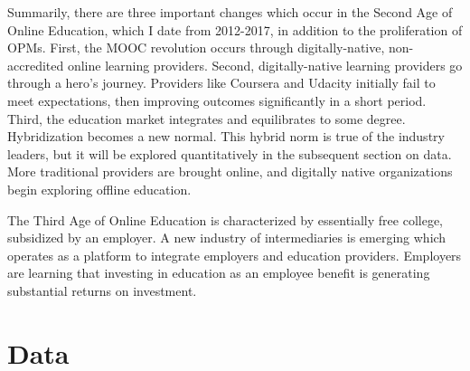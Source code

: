 \documentclass[review]{elsarticle}
\begin{document}
    Summarily, there are three important changes which occur in the Second Age of Online Education, which I date from 2012-2017, in addition to the proliferation of OPMs.
    First, the MOOC revolution occurs through digitally-native, non-accredited online learning providers.
    Second, digitally-native learning providers go through a hero's journey. Providers like Coursera and Udacity initially fail to meet expectations, then improving outcomes significantly in a short period.
    Third, the education market integrates and equilibrates to some degree. Hybridization becomes a new normal.
    This hybrid norm is true of the industry leaders, but it will be explored quantitatively in the subsequent section on data.
    More traditional providers are brought online, and digitally native organizations begin exploring offline education.

    The Third Age of Online Education is characterized by essentially free college, subsidized by an employer.
    A new industry of intermediaries is emerging which operates as a platform to integrate employers and education providers.
    Employers are learning that investing in education as an employee benefit is generating substantial returns on investment.

    \section{Data}
\end{document}
